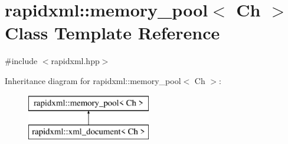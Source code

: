 \hypertarget{classrapidxml_1_1memory__pool}{}\section{rapidxml\+:\+:memory\+\_\+pool$<$ Ch $>$ Class Template Reference}
\label{classrapidxml_1_1memory__pool}


{\ttfamily \#include $<$rapidxml.\+hpp$>$}

Inheritance diagram for rapidxml\+:\+:memory\+\_\+pool$<$ Ch $>$\+:\begin{figure}[H]
\begin{center}
\leavevmode
\includegraphics[height=2.000000cm]{d1/d46/classrapidxml_1_1memory__pool}
\end{center}
\end{figure}
